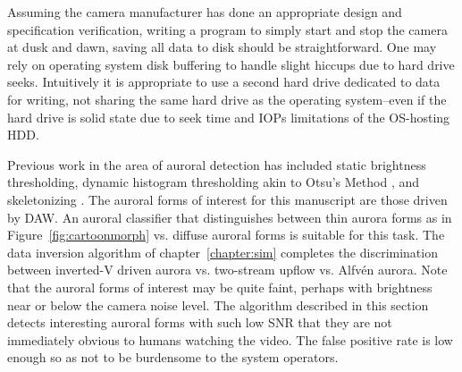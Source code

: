Assuming the camera manufacturer has done an appropriate design and specification verification, writing a program to simply start and stop the camera at dusk and dawn, saving all data to disk should be straightforward.
One may rely on operating system disk buffering to handle slight hiccups due to hard drive seeks.
Intuitively it is appropriate to use a second hard drive dedicated to data for writing, not sharing the same hard drive as the operating system--even if the hard drive is solid state due to seek time and IOPs limitations of the OS-hosting HDD.

Previous work in the area of auroral detection has included static brightness thresholding, dynamic histogram thresholding akin to Otsu's Method \citep{otsu1979}, and skeletonizing \citep{lam1992,saeed2010}.
The auroral forms of interest for this manuscript are those driven by DAW.
An auroral classifier that distinguishes between thin aurora forms as in Figure~\ref{fig:cartoonmorph} vs. diffuse auroral forms is suitable for this task. 
The data inversion algorithm of chapter~\ref{chapter:sim} completes the discrimination between inverted-V driven aurora vs. two-stream upflow vs. Alfvén aurora.
Note that the auroral forms of interest may be quite faint, perhaps with brightness near or below the camera noise level.
The algorithm described in this section detects interesting auroral forms with such low SNR that they are not immediately obvious to humans watching the video.
The false positive rate is low enough so as not to be burdensome to the system operators.

